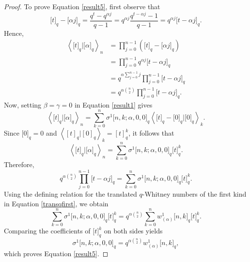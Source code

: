 \documentclass[12pt]{article}
\begin{document}
\begin{proof}
	To prove Equation \eqref{result5}, first observe that
	\begin{equation*}
		\big[t\big]_q-\big[\alpha j\big]_q=\frac{q^t-q^{\alpha j}}{q-1}=q^{\alpha j}\frac{q^{t-\alpha j}-1}{q-1}=q^{\alpha j}\big[t-\alpha j\big]_q.
	\end{equation*}
	Hence,
	\begin{align*}
		\left\langle \big[t\big]_q|\big[\alpha\big]_q\right\rangle_n
		&=\prod_{j=0}^{n-1}\left(\big[t\big]_q-\big[\alpha j\big]_q\right)\\
		&=\prod_{j=0}^{n-1}q^{\alpha j}\big[t-\alpha j\big]_q\\
		&=q^{\alpha\sum_{j=0}^{n-1}j}\prod_{j=0}^{n-1}\big[t-\alpha j\big]_q\\
		&=q^{\alpha\binom{n}{2}}\prod_{j=0}^{n-1}\big[t-\alpha j\big]_q.
	\end{align*}
	Now, setting $\beta=\gamma=0$ in Equation \eqref{result1} gives
	\begin{equation*}
		\left\langle \big[t\big]_q|\big[\alpha\big]_q\right\rangle_n=\sum_{k=0}^{n}\sigma^1\big[n,k;\alpha,0,0\big]_q\left\langle
		\big[t\big]_q-\big[0\big]_q\big|\big[0\big]_q\right\rangle_k.
	\end{equation*}
	Since $\big[0\big]_q=0$ and
	$\left\langle [t]_q|[0]_q\right\rangle_k=[t]_q^k$, it follows that
	\begin{equation*}
		\left\langle\big[t\big]_q|\big[\alpha\big]_q\right\rangle_n=\sum_{k=0}^{n}\sigma^1\big[n,k;\alpha,0,0\big]_q\big[t\big]_q^k.
	\end{equation*}
	Therefore,
	\begin{equation*}
		q^{\alpha\binom{n}{2}}\prod_{j=0}^{n-1}\big[t-\alpha j\big]_q=\sum_{k=0}^{n}\sigma^1\big[n,k;\alpha,0,0\big]_q
		\big[t\big]_q^k.
	\end{equation*}
	Using the defining relation for the translated $q$-Whitney numbers of the first kind in Equation \eqref{transqfirst}, we obtain
	\begin{equation*}
		\sum_{k=0}^{n}\sigma^1\big[n,k;\alpha,0,0\big]_q\big[t\big]_q^k=q^{\alpha\binom{n}{2}}\sum_{k=0}^{n}w^1_{(\alpha)}\big[n,k\big]_q\big[t\big]_q^k.
	\end{equation*}
	Comparing the coefficients of $\big[t\big]_q^k$ on both sides yields
	\begin{equation*}
		\sigma^1\big[n,k;\alpha,0,0\big]_q=q^{\alpha\binom{n}{2}}w^1_{(\alpha)}\big[n,k\big]_q,
	\end{equation*}
	which proves Equation \eqref{result5}.
	

\end{proof}
\end{document}
